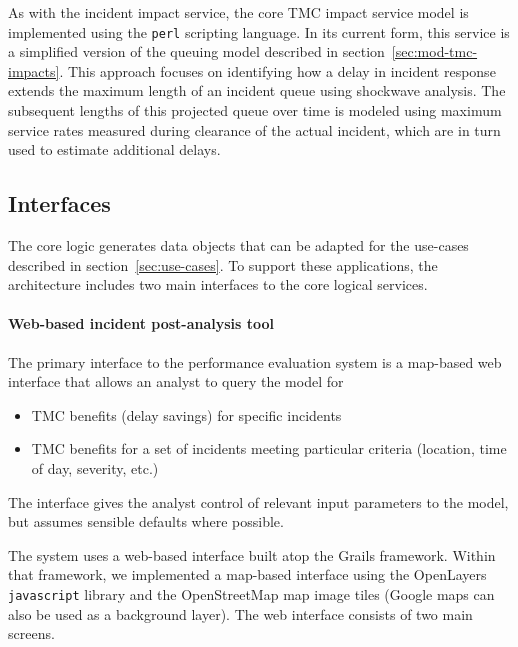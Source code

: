\documentclass[12pt]{report}
\newcounter{time}
\begin{document}
As with the incident impact service, the core TMC impact service model
is implemented using the \texttt{perl} scripting language.  In its
current form, this service is a simplified version of the queuing
model described in section~\ref{sec:mod-tmc-impacts}.  This approach
focuses on identifying how a delay in incident response extends the
maximum length of an incident queue using shockwave analysis.  The
subsequent lengths of this projected queue over time is modeled using
maximum service rates measured during clearance of the actual
incident, which are in turn used to estimate additional delays.


\subsection{Interfaces}
\label{sec:interfaces}

The core logic generates data objects that can be adapted for the
use-cases described in section~\ref{sec:use-cases}.  To support these
applications, the architecture includes two main interfaces to the
core logical services.  

\paragraph{Web-based incident post-analysis tool}

The primary interface to the performance evaluation system is a
map-based web interface that allows an analyst to query the model for
\begin{itemize}
\item \ac{TMC} benefits (delay savings) for specific incidents
\item \ac{TMC} benefits for a set of incidents meeting particular criteria
  (location, time of day, severity, etc.)
\end{itemize}
The interface gives the analyst control of relevant input parameters
to the model, but assumes sensible defaults where possible.

The system uses a web-based interface built atop the Grails framework.
Within that framework, we implemented a map-based interface using the
OpenLayers \texttt{javascript} library
\citep{openlayers10:_openl_user_guide} and the OpenStreetMap map image
tiles \citep{openstreetmap.org10:_opens_devel_guide} (Google maps can
also be used as a background layer).  The web interface consists of
two main screens.
\end{document}
